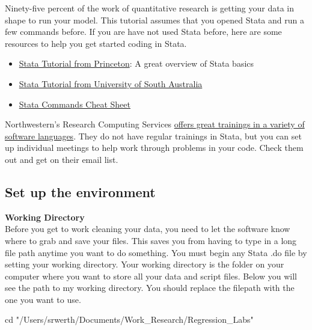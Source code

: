 \documentclass[
]{book}
\newenvironment{Shaded}{\begin{snugshade}}{\end{snugshade}}
\newcommand{\NormalTok}[1]{#1}
\newcommand{\StringTok}[1]{\textcolor[rgb]{0.31,0.60,0.02}{#1}}
\providecommand{\tightlist}{%
  \setlength{\itemsep}{0pt}\setlength{\parskip}{0pt}}
\begin{document}
Ninety-five percent of the work of quantitative research is getting your data in shape to run your model. This tutorial assumes that you opened Stata and run a few commands before. If you are have not used Stata before, here are some resources to help you get started coding in Stata.

\begin{itemize}
\tightlist
\item
  \href{https://www.princeton.edu/~otorres/StataTutorial.pdf}{Stata Tutorial from Princeton}: A great overview of Stata basics\\
\item
  \href{https://lo.unisa.edu.au/mod/book/view.php?id=641259}{Stata Tutorial from University of South Australia}
\item
  \href{https://www.stata.com/links/resources-for-learning-stata/cheat-sheets/StataCheatsheet_processing_June_2016_TE-REV.pdf}{Stata Commands Cheat Sheet}
\end{itemize}

Northwestern's Research Computing Services \href{https://www.it.northwestern.edu/research/training.html}{offers great trainings in a variety of software languages}. They do not have regular trainings in Stata, but you can set up individual meetings to help work through problems in your code. Check them out and get on their email list.

\hypertarget{cd}{%
\subsection*{Set up the environment}\label{cd}}

\textbf{Working Directory}\\
Before you get to work cleaning your data, you need to let the software know where to grab and save your files. This saves you from having to type in a long file path anytime you want to do something. You must begin any Stata .do file by setting your working directory. Your working directory is the folder on your computer where you want to store all your data and script files. Below you will see the path to my working directory. You should replace the filepath with the one you want to use.

\begin{Shaded}
\begin{Highlighting}[]
\NormalTok{cd }\StringTok{"/Users/srwerth/Documents/Work\_Research/Regression\_Labs"}
\end{Highlighting}
\end{Shaded}
\end{document}
